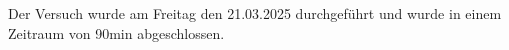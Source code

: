 Der Versuch wurde am Freitag den 21.03.2025 durchgeführt und wurde in einem Zeitraum von 90min abgeschlossen.
